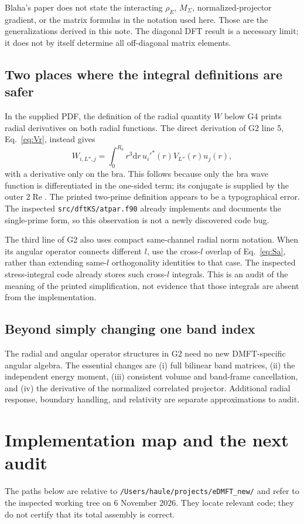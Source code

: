 \documentclass[11pt]{article}
\newcommand{\Rea}{\operatorname{Re}}
\newcommand{\dd}{\mathrm d}
\newcommand{\pathf}[1]{\nolinkurl{#1}}
\newcommand{\newpart}[1]{\par\Needspace{12\baselineskip}\section{#1}}
\begin{document}
Blaha's paper does not state the interacting $\rho_E$, $M_\Sigma$,
normalized-projector gradient, or the matrix formulas in the notation
used here. Those are the generalizations derived in this note. The
diagonal DFT result is a necessary limit; it does not by itself determine
all off-diagonal matrix elements.

\subsection{Two places where the integral definitions are safer}
In the supplied PDF, the definition of the radial quantity $W$ below
G4 prints radial derivatives on both radial functions. The direct
derivation of G2 line 5, Eq.~\eqref{eq:Vr}, instead gives
\begin{equation}
 W_{i,L'',j}=\int_0^{R_a}r^3\dd r\,u_i'^*(r)V_{L''}(r)u_j(r),
 \label{eq:W}
\end{equation}
with a derivative only on the bra. This follows because only the bra
wave function is differentiated in the one-sided term; its conjugate
is supplied by the outer $2\Rea$. The printed two-prime definition
appears to be a typographical error. The inspected
\pathf{src/dftKS/atpar.f90} already implements and documents the
single-prime form, so this observation is not a newly discovered code bug.

The third line of G2 also uses compact same-channel radial norm notation.
When its angular operator connects different $l$, use the cross-$l$
overlap of Eq.~\eqref{eq:Sa}, rather than extending same-$l$
orthogonality identities to that case. The inspected stress-integral
code already stores such cross-$l$ integrals. This is an audit of the
meaning of the printed simplification, not evidence that those
integrals are absent from the implementation.

\subsection{Beyond simply changing one band index}
The radial and angular operator structures in G2 need no new
DMFT-specific angular algebra. The essential changes are (i) full
bilinear band matrices, (ii) the independent energy moment, (iii)
consistent volume and band-frame cancellation, and (iv) the derivative
of the normalized correlated projector. Additional radial response,
boundary handling, and relativity are separate approximations to audit.

\newpart{Implementation map and the next audit}
\label{sec:audit}
The paths below are relative to
\pathf{/Users/haule/projects/eDMFT_new/} and refer to the inspected
working tree on 6 November 2026. They locate relevant code; they do
not certify that its total assembly is correct.
\end{document}
